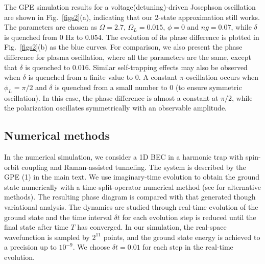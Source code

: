 \documentclass[twocolumn,prl,floatfix,citeautoscript,nofootinbib,superscriptaddress]{revtex4}
\begin{document}
The GPE simulation results for a voltage(detuning)-driven Josephson
oscillation are shown in Fig.~\ref{figs2}(a), indicating that our $2$-state
approximation still works. The parameters are chosen as $\Omega =2.7$, $%
\Omega _{L}=0.015$, $\phi =0$ and $ng=0.07$, while $\delta $ is quenched
from $0$ Hz to $0.054$. The evolution of its phase difference is plotted in
Fig.~\ref{figs2}(b) as the blue curves. For comparison, we also present the
phase difference for plasma oscillation, where all the parameters are the
same, except that $\delta $ is quenched to $0.016$. Similar self-trapping
effects may also be observed when $\delta $ is quenched from a finite value
to $0$. A constant $\pi $-oscillation occurs when $\phi _{L}=\pi /2$ and $%
\delta $ is quenched from a small number to $0$ (to ensure symmetric
oscillation). In this case, the phase difference is almost a constant at $%
\pi /2$, while the polarization oscillates symmetrically with an observable
amplitude.

\subsection{Numerical methods}

In the numerical simulation, we consider a 1D BEC in a harmonic trap with
spin-orbit coupling and Raman-assisted tunneling. The system is described by
the GPE (1) in the main text. We use imaginary-time evolution to obtain the
ground state numerically with a time-split-operator
numerical method \cite{Bader2013} (see \cite{Bao2003} for alternative methods). The resulting
phase diagram is compared with that generated though variational analysis.
The dynamics are studied through real-time evolution of the ground state
and the time interval $\delta t$ for each evolution step is reduced until
the final state after time $T$ has converged. In our simulation, the
real-space wavefunction is sampled by $2^{11}$ points, and the ground state
energy is achieved to a precision up to $10^{-9}$. We choose $\delta t=0.01$
for each step in the real-time evolution.
\end{document}
